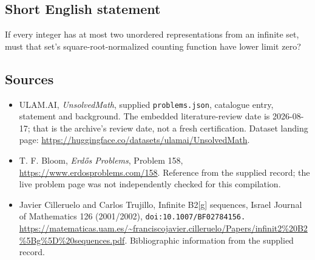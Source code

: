 \documentclass[11pt,a4paper]{article}
\begin{document}
\subsection{Short English statement}

If every integer has at most two unordered representations from an infinite set, must that set's square-root-normalized counting function have lower limit zero?

\subsection{Sources}

{\small

\begin{itemize}

\item[\hypertarget{source:statement:1}{S1}] ULAM.AI, \emph{UnsolvedMath}, supplied \texttt{problems.json}, catalogue entry, statement and background. The embedded literature-review date is 2026-08-17; that is the archive’s review date, not a fresh certification. Dataset landing page: \url{https://huggingface.co/datasets/ulamai/UnsolvedMath}.

\item[\hypertarget{source:statement:2}{S2}] T. F. Bloom, \emph{Erdős Problems}, Problem 158, \url{https://www.erdosproblems.com/158}. Reference from the supplied record; the live problem page was not independently checked for this compilation.

\item[\hypertarget{source:statement:3}{S3}] Javier Cilleruelo and Carlos Trujillo, Infinite B2[g] sequences, Israel Journal of Mathematics 126 (2001/2002), \nolinkurl{doi:10.1007/BF02784156.} \url{https://matematicas.uam.es/~franciscojavier.cilleruelo/Papers/infinit2%20B2%5Bg%5D%20sequences.pdf}. Bibliographic information from the supplied record.

\end{itemize}

}

\label{end:statement}
\end{document}
